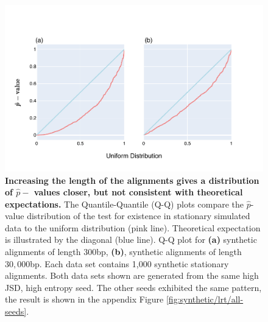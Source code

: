 \begin{figure}[htbp]
\centering
\includegraphics[width=\textwidth]{figures/plots/synthetic/lrt/197113_332182_17210-long_seq.pdf}
\caption[Increasing the length of the alignments gives a distribution of $\hat p-$ values closer, but not consistent with theoretical expectations]{\textbf{Increasing the length of the alignments gives a distribution of $\hat p-$ values closer, but not consistent with theoretical expectations.} The Quantile-Quantile (Q-Q) plots compare the $\hat p$-value distribution of the test for existence in stationary simulated data to the uniform distribution (pink line). Theoretical expectation is illustrated by the diagonal (blue line). Q-Q plot for \textbf{(a)} synthetic alignments of length $300$bp, \textbf{(b)}, synthetic alignments of length $30,000$bp. Each data set contains 1,000 synthetic stationary alignments. Both data sets shown are generated from the same high JSD, high entropy seed. The other seeds exhibited the same pattern, the result is shown in the appendix Figure \ref{fig:synthetic/lrt/all-seeds}.}
\label{fig:synthetic/lrt/197113-long_seq}
\end{figure}